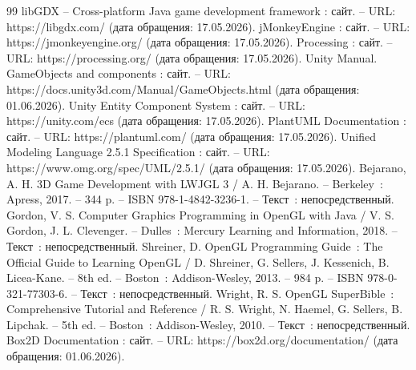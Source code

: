 \begin{thebibliography}{99}
	 libGDX -- Cross-platform Java game development framework : сайт. -- URL: https://libgdx.com/ (дата обращения: 17.05.2026).
	 jMonkeyEngine : сайт. -- URL: https://jmonkeyengine.org/ (дата обращения: 17.05.2026).
	 Processing : сайт. -- URL: https://processing.org/ (дата обращения: 17.05.2026).
	 Unity Manual. GameObjects and components : сайт. -- URL: https://docs.unity3d.com/Manual/GameObjects.html (дата обращения: 01.06.2026).
	 Unity Entity Component System : сайт. -- URL: https://unity.com/ecs (дата обращения: 17.05.2026).
	 PlantUML Documentation : сайт. -- URL: https://plantuml.com/ (дата обращения: 17.05.2026).
	 Unified Modeling Language 2.5.1 Specification : сайт. -- URL: https://www.omg.org/spec/UML/2.5.1/ (дата обращения: 17.05.2026).
	 Bejarano, A. H. 3D Game Development with LWJGL 3 / A. H. Bejarano. -- Berkeley~: Apress, 2017. -- 344 p. -- ISBN 978-1-4842-3236-1. -- Текст~: непосредственный.
	 Gordon, V. S. Computer Graphics Programming in OpenGL with Java / V. S. Gordon, J. L. Clevenger. -- Dulles~: Mercury Learning and Information, 2018. -- Текст~: непосредственный.
	 Shreiner, D. OpenGL Programming Guide~: The Official Guide to Learning OpenGL / D. Shreiner, G. Sellers, J. Kessenich, B. Licea-Kane. -- 8th ed. -- Boston~: Addison-Wesley, 2013. -- 984 p. -- ISBN 978-0-321-77303-6. -- Текст~: непосредственный.
	 Wright, R. S. OpenGL SuperBible~: Comprehensive Tutorial and Reference / R. S. Wright, N. Haemel, G. Sellers, B. Lipchak. -- 5th ed. -- Boston~: Addison-Wesley, 2010. -- Текст~: непосредственный.
	 Box2D Documentation : сайт. -- URL: https://box2d.org/documentation/ (дата обращения: 01.06.2026).
\end{thebibliography}
